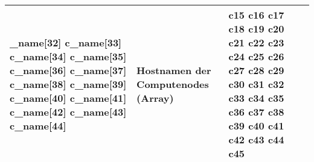 \begin{longtable}{| p{0.5cm} | p{3cm} | p{8.5cm} | p{4cm} |}
\_name[32] \newline c\_name[33] \newline c\_name[34] \newline c\_name[35] \newline c\_name[36] \newline c\_name[37] \newline c\_name[38] \newline c\_name[39] \newline c\_name[40] \newline c\_name[41] \newline c\_name[42] \newline c\_name[43] \newline c\_name[44] & Hostnamen der Computenodes (Array) & c15 \newline c16 \newline c17 \newline c18 \newline c19 \newline c20 \newline c21 \newline c22 \newline c23 \newline c24 \newline c25 \newline c26 \newline c27 \newline c28 \newline c29 \newline c30 \newline c31 \newline c32 \newline c33 \newline c34 \newline c35 \newline c36 \newline c37 \newline c38 \newline c39 \newline c40 \newline c41 \newline c42 \newline c43 \newline c44 \newline c45\\\hline 

\end{longtable}
